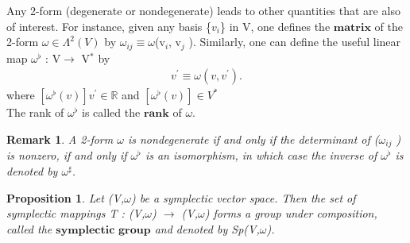 \documentclass[12pt,a4paper]{article}
\newtheorem{rem}[thm]{Remark}
\newtheorem{prop}{Proposition}
\begin{document}
Any 2-form (degenerate or nondegenerate) leads to other quantities that
are also of interest. For instance, given any basis \{$v_i$\} in V, one defines the
$\textbf{matrix}$ of the 2-form $\omega \in \Lambda^{2}(V)$ by $\omega_{ij} \equiv \omega$(v$_i$, v$_j$ ). Similarly, one can
define the useful linear map $\omega^{\flat}$ : V$\to$ V$^*$ by
\begin{eqnarray*}
 [ \omega^{\flat} (v) ] v^{'} \equiv \omega(v, v^{'}).
\end{eqnarray*}
\indent where $ [ \omega^{\flat} (v) ] v^{'} \in \mathbb{R}$ and  $ [ \omega^{\flat} (v) ] \in V^{*}$\\
The rank of $\omega^{\flat}$ is called the $\textbf{rank}$ of $\omega$.
\begin{rem}
A 2-form $\omega$ is nondegenerate if and only if the determinant of ($\omega_{ij}$ ) is nonzero, if and only if $\omega^{\flat}$ is an isomorphism, in which
case the inverse of $\omega^{\flat}$ is denoted by $\omega^{\sharp}$.
\end{rem}
\begin{prop}
Let (V,$\omega$) be a symplectic vector space. Then the set of
symplectic mappings T : (V,$\omega$) $\to$ (V,$\omega$) forms a group under composition,
called the $\textbf{symplectic group}$ and denoted by Sp(V,$\omega$).
\end{prop}
\end{document}
